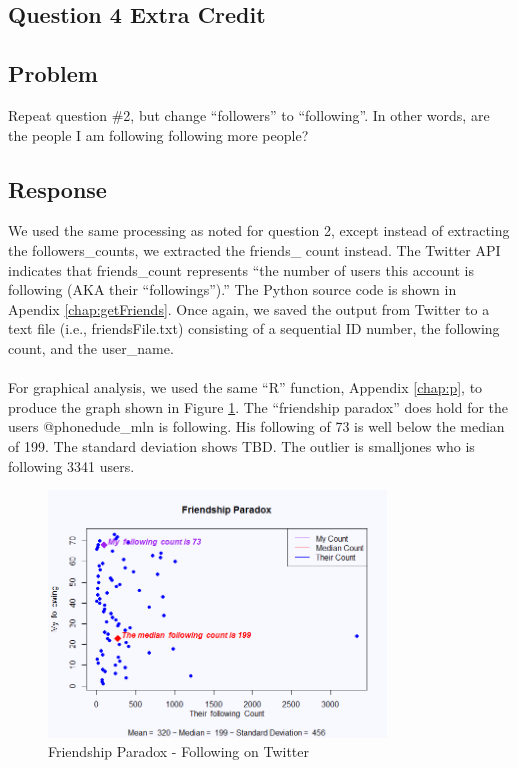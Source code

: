 \documentclass[letterpaper,11pt]{report}
\begin{document}
\begin{savenotes}
\section{Question 4 Extra Credit}
\subsection{Problem}Repeat question \#2, but change ``followers'' to ``following''. In other words, are the people I am following following more people?
\subsection{Response}We used the same processing as noted for question 2, except instead of extracting the followers\_counts, we extracted the friends\_ count instead. The Twitter API indicates that friends\_count represents ``the number of users this account is following (AKA their ``followings'').''  The Python source code is shown in Apendix \ref{chap:getFriends}. Once again, we saved the output from Twitter to a text file (i.e., friendsFile.txt) consisting of a sequential ID number, the following count, and the user\_name.

\paragraph{} For graphical analysis, we used the same ``R'' function, Appendix \ref{chap:p}, to produce the graph shown in Figure \ref{fig:followingParadox}. The ``friendship paradox'' does hold for the users @phonedude\_mln is following. His following of 73 is well below the median of 199. The standard deviation shows TBD.
The outlier is smalljones who is following 3341 users.

\begin{figure}[htbp]
	\centering
		\includegraphics[width=0.80\textwidth]{followingParadox.png}
	\caption{Friendship Paradox - Following on Twitter}
	\label{fig:followingParadox}
\end{figure}

\end{savenotes}
\end{document}
